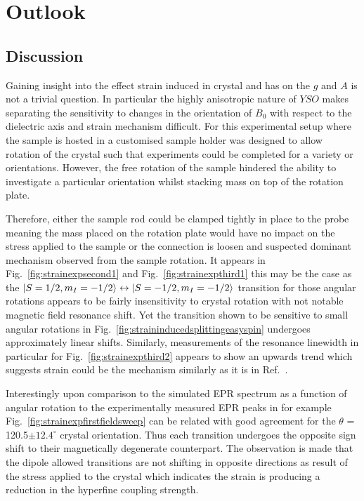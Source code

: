 \chapter{Outlook}

\section{\label{sec:discussion}Discussion}
Gaining insight into the effect strain induced in crystal and has on the $g$ and $A$ is not a trivial question. In particular the highly anisotropic nature of $YSO$ makes separating the sensitivity to changes in the orientation of $B_{0}$ with respect to the dielectric axis and strain mechanism difficult. For this experimental setup where the sample is hosted in a customised sample holder was designed to allow rotation of the crystal such that experiments could be completed for a variety or orientations. However, the free rotation of the sample hindered the ability to investigate a particular orientation whilst stacking mass on top of the rotation plate. 

Therefore, either the sample rod could be clamped tightly in place to the probe meaning the mass placed on the rotation plate would have no impact on the stress applied to the sample or the connection is loosen and suspected dominant mechanism observed from the sample rotation. It appears in Fig.~\ref{fig:strainexpsecond1} and Fig.~\ref{fig:strainexpthird1} this may be the case as the $\lvert S=1/2,m_{I}=-1/2\rangle \leftrightarrow \lvert S=-1/2,m_{I}=-1/2\rangle$ transition for those angular rotations appears to be fairly insensitivity to crystal rotation with not notable magnetic field resonance shift. Yet the transition shown to be sensitive to small angular rotations in Fig.~\ref{fig:straininducedsplittingeasyspin} undergoes approximately linear shifts. Similarly, measurements of the resonance linewidth in particular for Fig.~\ref{fig:strainexpthird2} appears to show an upwards trend which suggests strain could be the mechanism similarly as it is in Ref.~\citep{PhysRevLett.115.057601}.

Interestingly upon comparison to the simulated EPR spectrum as a function of angular rotation to the experimentally measured EPR peaks in for example Fig.~\ref{fig:strainexpfirstfieldsweep} can be related with good agreement for the $\theta$ = 120.5$\pm 12.4 ^{\circ}$ crystal orientation. Thus each transition undergoes the opposite sign shift to their magnetically degenerate counterpart. The observation is made that the dipole allowed transitions are not shifting in opposite directions as result of the stress applied to the crystal which indicates the strain is producing a reduction in the hyperfine coupling strength.


